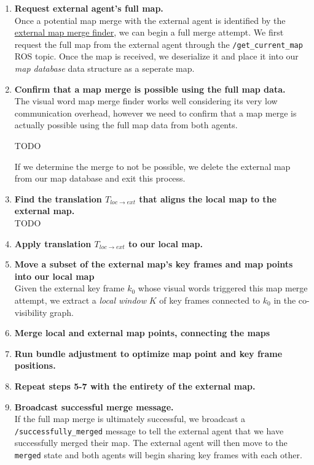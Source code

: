 \begin{enumerate}
    \item \textbf{Request external agent's full map.} \\
          Once a potential map merge with the external agent is identified by the \hyperref[sec:external-map-merge-finder]{external map merge finder}, we can begin a full merge attempt. We first request the full map from the external agent through the \texttt{/get\_current\_map} ROS topic. Once the map is received, we deserialize it and place it into our \textit{map database} data structure as a seperate map.
    \item \textbf{Confirm that a map merge is possible using the full map data.} \\
          The visual word map merge finder works well considering its very low communication overhead, however we need to confirm that a map merge is actually possible using the full map data from both agents.

          TODO

          If we determine the merge to not be possible, we delete the external map from our map database and exit this process.
    \item \textbf{Find the translation $T_{loc \rightarrow ext}$ that aligns the local map to the external map.} \\
          TODO
    \item \textbf{Apply translation $T_{loc \rightarrow ext}$ to our local map.} \\
    \item \textbf{Move a subset of the external map's key frames and map points into our local map} \\
          Given the external key frame $k_0$ whose visual words triggered this map merge attempt, we extract a \textit{local window} $K$ of key frames connected to $k_0$ in the co-visibility graph.
    \item \textbf{Merge local and external map points, connecting the maps} \\
    \item \textbf{Run bundle adjustment to optimize map point and key frame positions.} \\
    \item \textbf{Repeat steps 5-7 with the entirety of the external map.} \\
    \item \textbf{Broadcast successful merge message.} \\
          If the full map merge is ultimately successful, we broadcast a \texttt{/successfully\_merged} message to tell the external agent that we have successfully merged their map. The external agent will then move to the \texttt{merged} state and both agents will begin sharing key frames with each other.

\end{enumerate}

